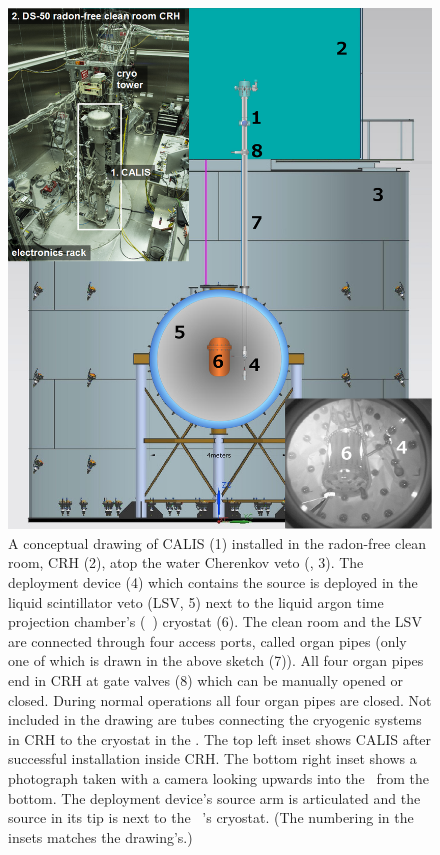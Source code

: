 \begin{figure}[htbp]
 \centering
\includegraphics[width=\textwidth]{Figures/DS50_with_CALIS_twoinsets}
\caption{A conceptual drawing of CALIS (1) installed in the radon-free clean room, CRH (2), atop the water Cherenkov veto (\wcv, 3). The deployment device (4) which contains the source is deployed in the liquid scintillator veto (LSV, 5) next to the liquid argon time projection chamber's (\lar\ \tpc) cryostat (6). The clean room and the LSV are connected through four access ports, called organ pipes (only one of which is drawn in the above sketch (7)). All four organ pipes end in CRH at gate valves (8) which can be manually opened or closed. During normal operations all four organ pipes are closed. Not included in the drawing are tubes connecting the cryogenic systems in CRH to the cryostat in the \lsv. The top left inset shows CALIS after successful installation inside CRH. The bottom right inset shows a photograph taken with a camera looking upwards into the \lsv\ from the bottom. The deployment device's source arm is articulated and the source in its tip is next to the \lar\ \tpc's cryostat. (The numbering in the insets matches the drawing's.) \label{fig:wholeAssembly_insideDetectors}\label{fig:DS50_with_CALIS}}
\end{figure}